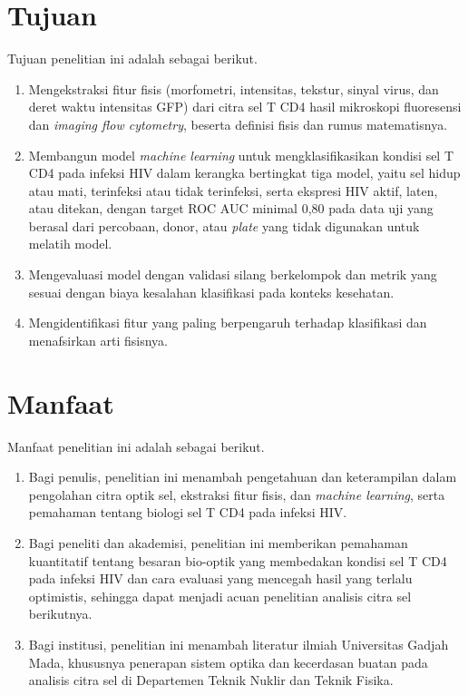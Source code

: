 \section{Tujuan}\label{tujuan}

Tujuan penelitian ini adalah sebagai berikut.

\begin{enumerate}
  \item Mengekstraksi fitur fisis (morfometri, intensitas, tekstur, sinyal virus, dan deret waktu intensitas GFP) dari citra sel T CD4 hasil mikroskopi fluoresensi dan \textit{imaging flow cytometry}, beserta definisi fisis dan rumus matematisnya.
  \item Membangun model \textit{machine learning} untuk mengklasifikasikan kondisi sel T CD4 pada infeksi HIV dalam kerangka bertingkat tiga model, yaitu sel hidup atau mati, terinfeksi atau tidak terinfeksi, serta ekspresi HIV aktif, laten, atau ditekan, dengan target ROC AUC minimal 0,80 pada data uji yang berasal dari percobaan, donor, atau \textit{plate} yang tidak digunakan untuk melatih model.
  \item Mengevaluasi model dengan validasi silang berkelompok dan metrik yang sesuai dengan biaya kesalahan klasifikasi pada konteks kesehatan.
  \item Mengidentifikasi fitur yang paling berpengaruh terhadap klasifikasi dan menafsirkan arti fisisnya.
\end{enumerate}

\section{Manfaat}\label{manfaat}

Manfaat penelitian ini adalah sebagai berikut.

\begin{enumerate}
  \item Bagi penulis, penelitian ini menambah pengetahuan dan keterampilan dalam pengolahan citra optik sel, ekstraksi fitur fisis, dan \textit{machine learning}, serta pemahaman tentang biologi sel T CD4 pada infeksi HIV.
  \item Bagi peneliti dan akademisi, penelitian ini memberikan pemahaman kuantitatif tentang besaran bio-optik yang membedakan kondisi sel T CD4 pada infeksi HIV dan cara evaluasi yang mencegah hasil yang terlalu optimistis, sehingga dapat menjadi acuan penelitian analisis citra sel berikutnya.
  \item Bagi institusi, penelitian ini menambah literatur ilmiah Universitas Gadjah Mada, khususnya penerapan sistem optika dan kecerdasan buatan pada analisis citra sel di Departemen Teknik Nuklir dan Teknik Fisika.
\end{enumerate}
